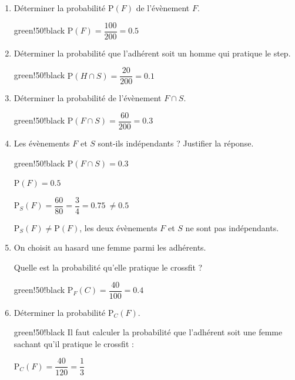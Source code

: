 \documentclass[10pt]{article}
\providecommand{\np}[2][]{{#2~#1}}
\begin{document}
	\begin{enumerate}
		\item Déterminer la probabilité $\text{P}(F)$ de l'évènement $F$.
		
		\begin{color}{green!50!black}
		$\text{P}(F)=\dfrac{100}{200}=\np{0.5}$
		\end{color}
		
		\item Déterminer la probabilité que l'adhérent soit un homme qui pratique le step.
		
		\begin{color}{green!50!black}
		$\text{P}(H\cap S)=\dfrac{20}{200}=\np{0.1}$
		\end{color}
		
		\item Déterminer la probabilité de l'évènement $F\cap S$.
		
		\begin{color}{green!50!black}
		$\text{P}(F\cap S)=\dfrac{60}{200}=\np{0.3}$
		\end{color}
		
		\item Les évènements $F$ et $S$ sont-ils indépendants ? Justifier la réponse.
		
		\begin{color}{green!50!black}
		$\text{P}(F\cap S)=\np{0.3}$
		
		$\text{P}(F)=\np{0.5}$
		
		$\text{P}_{S}(F)=\dfrac{60}{80} = \dfrac{3}{4} = \np{0.75} \neq \np{0.5}$
		
		$\text{P}_{S}(F)\neq \text{P}(F)$, les deux évènements $F$ et $S$ ne sont pas indépendants.
		\end{color}
		
		\item On choisit au hasard une femme parmi les adhérents.
		
		Quelle est la probabilité qu'elle pratique le crossfit ?
		
		
		\begin{color}{green!50!black}
		$\text{P}_{F}(C)=\dfrac{40}{100} = \np{0.4}$
	
		\end{color}
		\item Déterminer la probabilité $\text{P}_{C}(F)$.

		\begin{color}{green!50!black}
		 Il faut calculer la probabilité que l'adhérent soit une femme sachant qu'il pratique le crossfit :
		 
		$\text{P}_{C}(F)=\dfrac{40}{120} = \dfrac{1}{3}$
	
		\end{color}

	\end{enumerate}
\end{document}
